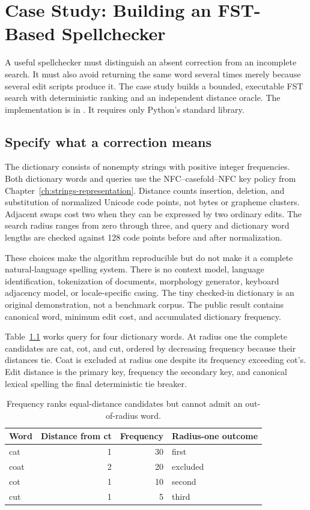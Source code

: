 \chapter{Case Study: Building an FST-Based Spellchecker}
\label{ch:fst-spellchecker}

A useful spellchecker must distinguish an absent correction from an incomplete search.
It must also avoid returning the same word several times merely because several edit scripts produce it.
The case study builds a bounded, executable FST search with deterministic ranking and an independent distance oracle.
The implementation is  in .
It requires only Python's standard library.

\section{Specify what a correction means}
\label{sec:ch80-contract}
The dictionary consists of nonempty strings with positive integer frequencies.
Both dictionary words and queries use the NFC--casefold--NFC key policy from Chapter~\ref{ch:strings-representation}.
Distance counts insertion, deletion, and substitution of normalized Unicode code points, not bytes or grapheme clusters.
Adjacent swaps cost two when they can be expressed by two ordinary edits.
The search radius ranges from zero through three, and query and dictionary word lengths are checked against 128 code points before and after normalization.

These choices make the algorithm reproducible but do not make it a complete natural-language spelling system.
There is no context model, language identification, tokenization of documents, morphology generator, keyboard adjacency model, or locale-specific casing.
The tiny checked-in dictionary is an original demonstration, not a benchmark corpus.
The public result contains canonical word, minimum edit cost, and accumulated dictionary frequency.

Table~\ref{tab:ch80-ranking} works query  for four dictionary words.
At radius one the complete candidates are cat, cot, and cut, ordered by decreasing frequency because their distances tie.
Coat is excluded at radius one despite its frequency exceeding cot's.
Edit distance is the primary key, frequency the secondary key, and canonical lexical spelling the final deterministic tie breaker.

\begin{table}[htbp]
\caption{Frequency ranks equal-distance candidates but cannot admit an out-of-radius word.}
\label{tab:ch80-ranking}
\centering
\begin{tabular}{lrrl}
\toprule
Word & Distance from ct & Frequency & Radius-one outcome \\
\midrule
cat & 1 & 30 & first \\
coat & 2 & 20 & excluded \\
cot & 1 & 10 & second \\
cut & 1 & 5 & third \\
\bottomrule
\end{tabular}
\end{table}

